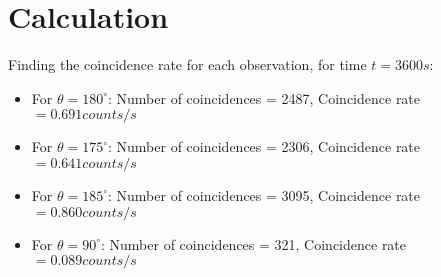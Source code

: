 \section{Calculation}
	Finding the coincidence rate for each observation, for time $t = 3600s$:

	\begin{itemize}
		\item{For $\theta = 180^\circ$:} Number of coincidences = 2487, Coincidence rate $= 0.691 counts/s$
		\item{For $\theta = 175^\circ$:} Number of coincidences = 2306, Coincidence rate $= 0.641 counts/s$
		\item{For $\theta = 185^\circ$:} Number of coincidences = 3095, Coincidence rate $= 0.860 counts/s$
		\item{For $\theta = 90^\circ$:} Number of coincidences = 321, Coincidence rate $= 0.089 counts/s$
	\end{itemize}